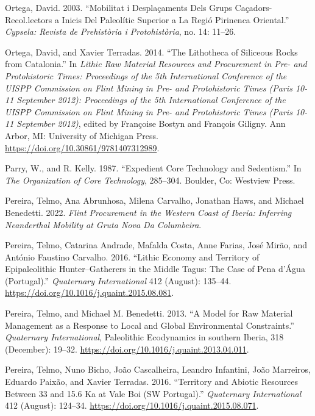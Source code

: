 \documentclass[
  a4paper,
  DIV=11,
  numbers=noendperiod]{scrreprt}
\newlength{\cslhangindent}
\newenvironment{CSLReferences}[2] %
 {\begin{list}{}{%
  \setlength{\itemindent}{0pt}
  \setlength{\leftmargin}{0pt}
  \setlength{\parsep}{0pt}
  \ifodd #1
   \setlength{\leftmargin}{\cslhangindent}
   \setlength{\itemindent}{-1\cslhangindent}
  \fi
  \setlength{\itemsep}{#2\baselineskip}}}
 {\end{list}}
\begin{document}
\begin{CSLReferences}{1}{0}
Ortega, David. 2003. {``Mobilitat i Despla{ç}aments Dels Grups
Ca{ç}adors-Recol.lectors a Inicis Del {Paleol{í}tic Superior} a La
Regi{ó} Pirinenca Oriental.''} \emph{Cypsela: Revista de Prehist{ò}ria i
Protohist{ò}ria}, no. 14: 11--26.

Ortega, David, and Xavier Terradas. 2014. {``The Lithotheca of Siliceous
Rocks from {Catalonia}.''} In \emph{Lithic {Raw Material Resources} and
{Procurement} in {Pre-} and {Protohistoric Times}: {Proceedings} of the
5th {International Conference} of the {UISPP Commission} on {Flint
Mining} in {Pre-} and {Protohistoric Times} ({Paris} 10-11 {September}
2012): {Proceedings} of the 5th {International Conference} of the {UISPP
Commission} on {Flint Mining} in {Pre-} and {Protohistoric Times}
({Paris} 10-11 {September} 2012)}, edited by Françoise Bostyn and
François Giligny. Ann Arbor, MI: University of Michigan Press.
\url{https://doi.org/10.30861/9781407312989}.

Parry, W., and R. Kelly. 1987. {``Expedient {Core Technology} and
{Sedentism}.''} In \emph{The {Organization} of {Core Technology}},
285--304. Boulder, Co: Westview Press.

Pereira, Telmo, Ana Abrunhosa, Milena Carvalho, Jonathan Haws, and
Michael Benedetti. 2022. \emph{Flint Procurement in the Western Coast of
{Iberia}: Inferring Neanderthal Mobility at {Gruta Nova} Da
{Columbeira}}.

Pereira, Telmo, Catarina Andrade, Mafalda Costa, Anne Farias, José
Mirão, and António Faustino Carvalho. 2016. {``Lithic Economy and
Territory of {Epipaleolithic} Hunter--Gatherers in the {Middle Tagus}:
{The} Case of {Pena} d'{{Á}gua} ({Portugal}).''} \emph{Quaternary
International} 412 (August): 135--44.
\url{https://doi.org/10.1016/j.quaint.2015.08.081}.

Pereira, Telmo, and Michael M. Benedetti. 2013. {``A Model for Raw
Material Management as a Response to Local and Global Environmental
Constraints.''} \emph{Quaternary International}, Paleolithic
{Ecodynamics} in southern {Iberia}, 318 (December): 19--32.
\url{https://doi.org/10.1016/j.quaint.2013.04.011}.

Pereira, Telmo, Nuno Bicho, João Cascalheira, Leandro Infantini, João
Marreiros, Eduardo Paixão, and Xavier Terradas. 2016. {``Territory and
Abiotic Resources Between 33 and 15.6 Ka at {Vale Boi} ({SW
Portugal}).''} \emph{Quaternary International} 412 (August): 124--34.
\url{https://doi.org/10.1016/j.quaint.2015.08.071}.


\end{CSLReferences}
\end{document}
